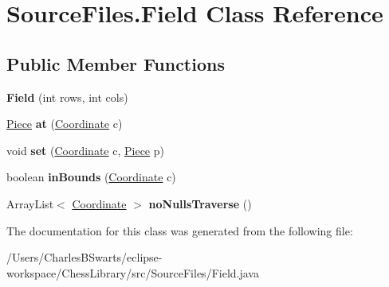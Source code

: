 \hypertarget{class_source_files_1_1_field}{}\section{Source\+Files.\+Field Class Reference}
\label{class_source_files_1_1_field}
\subsection*{Public Member Functions}
\begin{DoxyCompactItemize}
\item 
\mbox{\label{class_source_files_1_1_field_a51a2df71be8b7c3aa45982648794b60d}} 
{\bfseries Field} (int rows, int cols)
\item 
\mbox{\label{class_source_files_1_1_field_a39605884440965bdd30128b68a6bbea3}} 
\mbox{\hyperlink{class_source_files_1_1_piece}{Piece}} {\bfseries at} (\mbox{\hyperlink{class_source_files_1_1_coordinate}{Coordinate}} c)
\item 
\mbox{\label{class_source_files_1_1_field_a0c37dd4602bf2c74364294469e20e286}} 
void {\bfseries set} (\mbox{\hyperlink{class_source_files_1_1_coordinate}{Coordinate}} c, \mbox{\hyperlink{class_source_files_1_1_piece}{Piece}} p)
\item 
\mbox{\label{class_source_files_1_1_field_a67894dae4f9cdc813cc31abadbe1c813}} 
boolean {\bfseries in\+Bounds} (\mbox{\hyperlink{class_source_files_1_1_coordinate}{Coordinate}} c)
\item 
\mbox{\label{class_source_files_1_1_field_a5a7c1a071941e7fa0361121ad7a3ec9a}} 
Array\+List$<$ \mbox{\hyperlink{class_source_files_1_1_coordinate}{Coordinate}} $>$ {\bfseries no\+Nulls\+Traverse} ()
\end{DoxyCompactItemize}


The documentation for this class was generated from the following file\+:\begin{DoxyCompactItemize}
\item 
/\+Users/\+Charles\+B\+Swarts/eclipse-\/workspace/\+Chess\+Library/src/\+Source\+Files/Field.\+java\end{DoxyCompactItemize}
